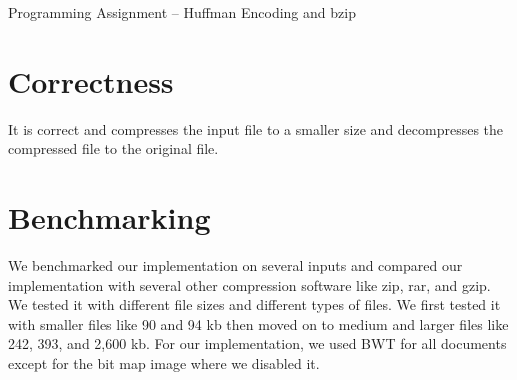 \documentclass[12pt,letterpaper]{article}
\begin{document}
\begin{center}
    \LARGE Programming Assignment -- Huffman Encoding and bzip
\end{center}

\section*{Correctness}
It is correct and compresses the input file to a smaller size and decompresses the compressed file to the original file.

\section*{Benchmarking}
We benchmarked our implementation on several inputs and compared our implementation with several other compression software like 
zip, rar, and gzip. We tested it with different file sizes and different types of files. 
We first tested it with smaller files like 90 and 94 kb then moved on to medium and larger files like 242, 393, and 2,600 kb.
For our implementation, we used BWT for all documents except for the bit map image where we disabled it.

\begin{table}[h]
    \caption{Compression Sizes}
\end{table}
\end{document}
